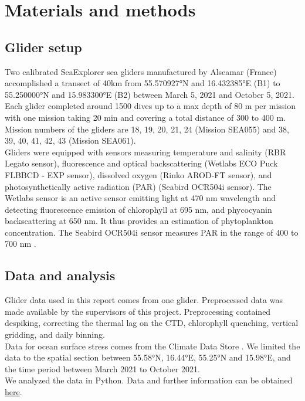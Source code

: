 \documentclass[../Main.tex]{subfiles}
\begin{document}
\section{Materials and methods}
\subsection{Glider setup}
Two calibrated SeaExplorer sea gliders manufactured by Alseamar (France) accomplished a transect of 40km from 55.570927°N and 16.432385°E (B1) to 55.250000°N and 15.983300°E (B2) between March 5, 2021 and October 5, 2021.
Each glider completed around 1500 dives up to a max depth of 80 m per mission with one mission taking 20 min and covering a total distance of 300 to 400 m.
Mission numbers of the gliders are 18, 19, 20, 21, 24 (Mission SEA055) and 38, 39, 40, 41, 42, 43 (Mission SEA061).
\\
Gliders were equipped with sensors measuring temperature and salinity (RBR Legato sensor), fluorescence and optical backscattering (Wetlabs ECO Puck FLBBCD - EXP sensor), dissolved oxygen (Rinko AROD-FT sensor), and photosynthetically active radiation (PAR) (Seabird OCR504i sensor).
The Wetlabs sensor is an active sensor emitting light at 470 nm wavelength and detecting fluorescence emission of chlorophyll at 695 nm, and phycocyanin backscattering at 650 nm.
It thus provides an estimation of phytoplankton concentration.
The Seabird OCR504i sensor measures PAR in the range of 400 to 700 nm \cite{x}.

\subsection{Data and analysis}
Glider data used in this report comes from one glider.
Preprocessed data was made available by the supervisors of this project.
Preprocessing contained despiking, correcting the thermal lag on the CTD, chlorophyll quenching, vertical gridding, and daily binning.
\\
Data for ocean surface stress comes from the Climate Data Store \cite{x}.
We limited the data to the spatial section between 55.58°N, 16.44°E, 55.25°N and 15.98°E, and the time period between March 2021 to October 2021.
\\
We analyzed the data in Python.
Data and further information can be obtained \href{https://github.com/joaldi2208/BloomDynamics}{here}.
\end{document}
